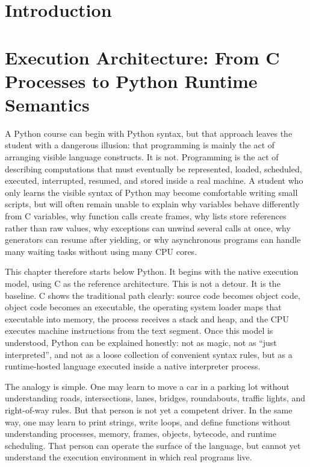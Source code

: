 \documentclass[a4paper,twoside]{report}
\begin{document}
\tableofcontents

\clearpage

\chapter{Introduction}

\chapter{Execution Architecture: From C Processes to Python Runtime Semantics}

A Python course can begin with Python syntax, but that approach leaves the student with a dangerous illusion: that programming is mainly the act of arranging visible language constructs. It is not. Programming is the act of describing computations that must eventually be represented, loaded, scheduled, executed, interrupted, resumed, and stored inside a real machine. A student who only learns the visible syntax of Python may become comfortable writing small scripts, but will often remain unable to explain why variables behave differently from C variables, why function calls create frames, why lists store references rather than raw values, why exceptions can unwind several calls at once, why generators can resume after yielding, or why asynchronous programs can handle many waiting tasks without using many CPU cores.

This chapter therefore starts below Python. It begins with the native execution model, using C as the reference architecture. This is not a detour. It is the baseline. C shows the traditional path clearly: source code becomes object code, object code becomes an executable, the operating system loader maps that executable into memory, the process receives a stack and heap, and the CPU executes machine instructions from the text segment. Once this model is understood, Python can be explained honestly: not as magic, not as ``just interpreted'', and not as a loose collection of convenient syntax rules, but as a runtime-hosted language executed inside a native interpreter process.

The analogy is simple. One may learn to move a car in a parking lot without understanding roads, intersections, lanes, bridges, roundabouts, traffic lights, and right-of-way rules. But that person is not yet a competent driver. In the same way, one may learn to print strings, write loops, and define functions without understanding processes, memory, frames, objects, bytecode, and runtime scheduling. That person can operate the surface of the language, but cannot yet understand the execution environment in which real programs live.
\end{document}
